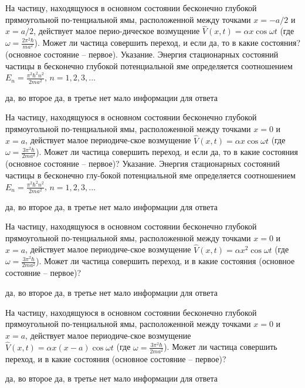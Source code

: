 \documentclass[11pt,a4paper]{exam}
\begin{document}
\begin{questions}
\question На частицу, находящуюся в основном состоянии бесконечно глубокой прямоугольной по-тенциальной ямы, расположенной между точками $x =  - a/2$ и $x = a/2$, действует малое перио-дическое возмущение $\hat V(x,t) = \alpha x\cos \omega t$ (где $\omega  = \frac{{2{\pi ^2}\hbar }}{{m{a^2}}}$). Может ли частица совершить переход, и если да, то в какие состояния? (основное состояние – первое). Указание. Энергия стационарных состояний частицы в бесконечно глубокой потенциальной яме определяется соотношением ${E_n} = \frac{{{\pi ^2}{\hbar ^2}{n^2}}}{{2m{a^2}}}$, $n = 1,2,3,...$
\begin{choices}
\choice да, во второе  
\choice да, в третье      
\choice нет      
\choice мало информации для ответа
\end{choices}

\question На частицу, находящуюся в основном состоянии бесконечно глубокой прямоугольной по-тенциальной ямы, расположенной между точками $x = 0$ и $x = a$, действует малое периодиче-ское возмущение $\hat V(x,t) = \alpha x\cos \omega t$ (где $\omega  = \frac{{3{\pi ^2}\hbar }}{{2m{a^2}}}$). Может ли частица совершить переход, и если да, то в какие состояния (основное состояние – первое)? Указание. Энергия стационарных состояний частицы в бесконечно глу-бокой потенциальной яме определяется соотношением ${E_n} = \frac{{{\pi ^2}{\hbar ^2}{n^2}}}{{2m{a^2}}}$, $n = 1,2,3,...$
\begin{choices}
\choice да, во второе  
\choice да, в третье      
\choice нет      
\choice мало информации для ответа
\end{choices}

\question На частицу, находящуюся в основном состоянии бесконечно глубокой прямоугольной по-тенциальной ямы, расположенной между точками $x = 0$ и $x = a$, действует малое периодиче-ское возмущение $\hat V(x,t) = \alpha {x^2}\cos \omega t$ (где $\omega  = \frac{{3{\pi ^2}\hbar }}{{2m{a^2}}}$). Может ли частица совершить переход, и в какие состояния (основное состояние – первое)?
\begin{choices}
\choice да, во второе  
\choice да, в третье      
\choice нет      
\choice мало информации для ответа
\end{choices}

\question На частицу, находящуюся в основном состоянии бесконечно глубокой прямоугольной по-тенциальной ямы, расположенной между точками $x = 0$ и $x = a$, действует малое периодиче-ское возмущение $\hat V(x,t) = \alpha x(x - a)\cos \omega t$ (где $\omega  = \frac{{3{\pi ^2}\hbar }}{{2m{a^2}}}$). Может ли частица совершить переход, и в какие состояния (основное состояние – первое)?
\begin{choices}
\choice да, во второе  
\choice да, в третье      
\choice нет      
\choice мало информации для ответа
\end{choices}


\end{questions}
\end{document}
